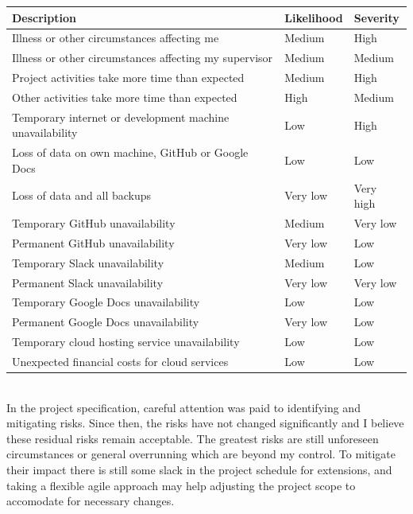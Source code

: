 \documentclass[a4paper,fleqn,12pt]{article}
\begin{document}
\begin{adjustbox}{center}\begin{tabular}{ |l|l|l| }
  \hline
  \textbf{Description} & \textbf{Likelihood} & \textbf{Severity} \\
  \hline
  Illness or other circumstances affecting me & Medium & High \\
  \hline
  Illness or other circumstances affecting my supervisor & Medium & Medium \\
  \hline
  Project activities take more time than expected & Medium & High \\
  \hline
  Other activities take more time than expected & High & Medium \\
  \hline
  Temporary internet or development machine unavailability & Low & High \\
  \hline
  Loss of data on own machine, GitHub or Google Docs & Low & Low \\
  \hline
  Loss of data and all backups & Very low & Very high \\
  \hline
  Temporary GitHub unavailability & Medium & Very low \\
  \hline
  Permanent GitHub unavailability & Very low & Low \\
  \hline
  Temporary Slack unavailability & Medium & Low \\
  \hline
  Permanent Slack unavailability & Very low & Very low \\
  \hline
  Temporary Google Docs unavailability & Low & Low \\
  \hline
  Permanent Google Docs unavailability & Very low & Low \\
  \hline
  Temporary cloud hosting service unavailability & Low & Low \\
  \hline
  Unexpected financial costs for cloud services & Low & Low \\
  \hline
\end{tabular}\end{adjustbox}\\

In the project specification, careful attention was paid to identifying and mitigating risks. Since then, the risks have not changed significantly and I believe these residual risks remain acceptable. The greatest risks are still unforeseen circumstances or general overrunning which are beyond my control. To mitigate their impact there is still some slack in the project schedule for extensions, and taking a flexible agile approach may help adjusting the project scope to accomodate for necessary changes.
\end{document}
